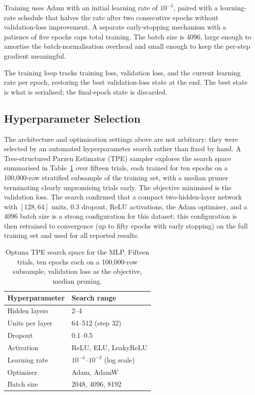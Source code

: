 \par Training uses Adam with an initial learning rate of $10^{-3}$, paired with a learning-rate schedule that halves the rate after two consecutive epochs without validation-loss improvement. A separate early-stopping mechanism with a patience of five epochs caps total training. The batch size is 4096, large enough to amortise the batch-normalisation overhead and small enough to keep the per-step gradient meaningful.

\par The training loop tracks training loss, validation loss, and the current learning rate per epoch, restoring the best validation-loss state at the end. The best state is what is serialised; the final-epoch state is discarded.

\subsection{Hyperparameter Selection}
\label{subsec:hpo}

\par The architecture and optimisation settings above are not arbitrary: they were selected by an automated hyperparameter search rather than fixed by hand. A Tree-structured Parzen Estimator (TPE) sampler explores the search space summarised in Table~\ref{tab:hpo_space} over fifteen trials, each trained for ten epochs on a 100{,}000-row stratified subsample of the training set, with a median pruner terminating clearly unpromising trials early. The objective minimised is the validation loss. The search confirmed that a compact two-hidden-layer network with $[128, 64]$ units, $0.3$ dropout, ReLU activations, the Adam optimiser, and a $4096$ batch size is a strong configuration for this dataset; this configuration is then retrained to convergence (up to fifty epochs with early stopping) on the full training set and used for all reported results.

\begin{table}[htbp]
\begin{center}
\begin{tabular}{|p{120pt}|p{200pt}|}
\hline
\textbf{Hyperparameter} & \textbf{Search range} \\
\hline
\hline Hidden layers & 2--4 \\
\hline Units per layer & 64--512 (step 32) \\
\hline Dropout & 0.1--0.5 \\
\hline Activation & ReLU, ELU, LeakyReLU \\
\hline Learning rate & $10^{-4}$--$10^{-2}$ (log scale) \\
\hline Optimiser & Adam, AdamW \\
\hline Batch size & 2048, 4096, 8192 \\
\hline
\end{tabular}
\end{center}
\caption{Optuna TPE search space for the MLP. Fifteen trials, ten epochs each on a 100{,}000-row subsample, validation loss as the objective, median pruning.}
\label{tab:hpo_space}
\end{table}

